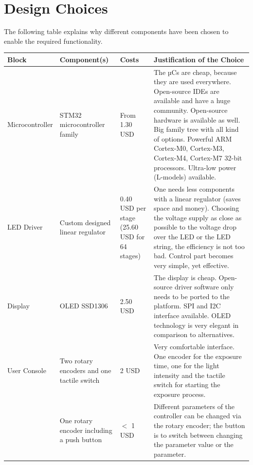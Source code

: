 \section{Design Choices}

The following table explains why different components have been chosen to enable the required functionality.

\begin{table}[H]
	\centering 
	\begin{tabular}{p{} p{} p{} 
		p{} } 
		\textbf{Block} &
		\textbf{Component(s)}&
		\textbf{Costs}& 
		\textbf{Justification of the
		Choice}\\\hline
		Microcontroller &
        STM32 microcontroller family &
        From 1.30 USD & 
        The µCs are cheap, because they are used everywhere. Open-source \glspl{IDE} are available and have a huge community. Open-source hardware is available as well. Big family tree with all kind of options. Powerful ARM Cortex-M0, Cortex-M3, Cortex-M4, Cortex-M7 32-bit processors. Ultra-low power (L-models) available. \\\hline 
        \gls{LED} Driver & 
        Custom designed linear regulator &
        0.40 USD per stage (25.60 USD for 64 stages) &
        One needs less components with a linear regulator (saves space and money). Choosing the voltage supply as close as possible to the voltage drop over the \gls{LED} or the \gls{LED} string, the efficiency is not too bad. Control part becomes very simple, yet effective. \\\hline
        Display &
        \gls{OLED} SSD1306 &
        2.50 USD &
        The display is cheap. Open-source driver software only needs to be ported to the platform. \gls{SPI} and \gls{I2C} interface available. \gls{OLED} technology is very elegant in comparison to alternatives.\\\hline
        User Console &
        Two rotary encoders and one tactile switch & 
        2 USD & 
        Very comfortable interface. One encoder for the exposure time, one for the light intensity and the tactile switch for starting the exposure process.\\
         &
        One rotary encoder including a push button & 
        \(<\) 1 USD & 
        Different parameters of the controller can be changed via the rotary encoder; the button is to switch between changing the parameter value or the parameter.\\\hline 

\end{tabular}
\end{table}
